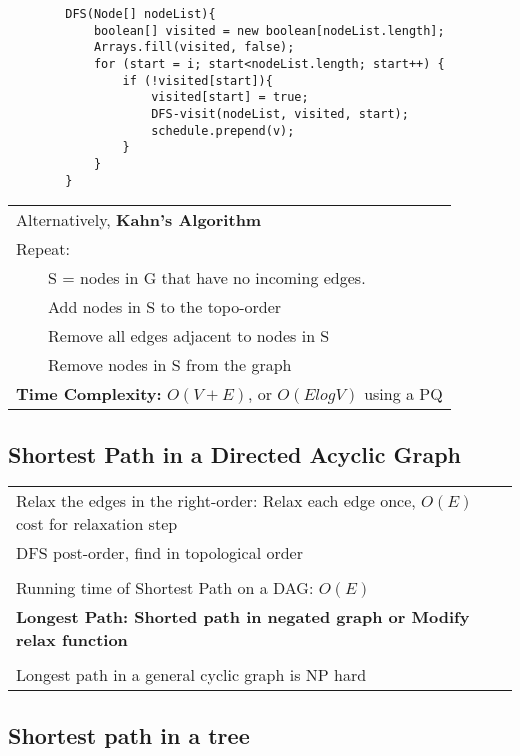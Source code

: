 \documentclass{article}
\newcommand{\tabitem}{~~\llap{\textbullet}~~}
\begin{document}
    \begin{verbatim}
        DFS(Node[] nodeList){
            boolean[] visited = new boolean[nodeList.length];
            Arrays.fill(visited, false);
            for (start = i; start<nodeList.length; start++) {
                if (!visited[start]){
                    visited[start] = true;
                    DFS-visit(nodeList, visited, start);
                    schedule.prepend(v);
                }
            }
        }
    \end{verbatim}

    \begin{tabular}{l}
        Alternatively, \textbf{Kahn's Algorithm}\\
        Repeat:\\
        \tabitem S = nodes in G that have no incoming edges.\\
        \tabitem Add nodes in S to the topo-order\\
        \tabitem Remove all edges adjacent to nodes in S\\
        \tabitem Remove nodes in S from the graph\\
        \textbf{Time Complexity: }$O(V+E)$, or $O(ElogV)$ using a PQ\\
    \end{tabular}

    \subsection{Shortest Path in a Directed Acyclic Graph}

    \begin{tabular}{l}
        Relax the edges in the right-order: Relax each edge once, $O(E)$ cost for relaxation step\\
        DFS post-order, find in topological order\\\\
        Running time of Shortest Path on a DAG: $O(E)$\\
        \textbf{Longest Path: Shorted path in negated graph or Modify relax function}\\\\
        Longest path in a general cyclic graph is NP hard\\
    \end{tabular}

    \subsection{Shortest path in a tree}
\end{document}
